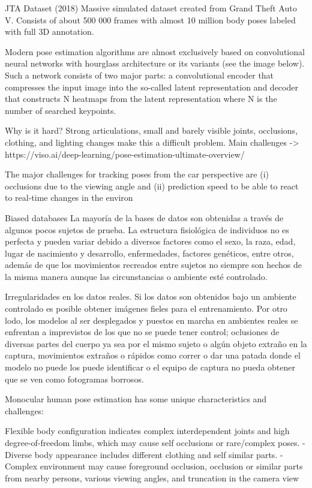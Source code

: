 JTA Dataset (2018)
Massive simulated dataset created from Grand Theft Auto V. Consists of about 500 000 frames with
almost 10 million body poses labeled with full 3D annotation.

Modern pose estimation algorithms are almost exclusively based on convolutional neural networks
with hourglass architecture or its variants (see the image below). Such a network consists of two
major parts: a convolutional encoder that compresses the input image into the so-called latent
representation and decoder that constructs N heatmaps from the latent representation where N is the
number of searched keypoints.

Why is it hard?
Strong articulations, small and barely visible joints, occlusions, clothing, and lighting changes
make this a difficult problem.
Main challenges -> https://viso.ai/deep-learning/pose-estimation-ultimate-overview/

The major challenges for tracking poses from the car perspective are
(i) occlusions due to the viewing angle and (ii) prediction
speed to be able to react to real-time changes in the environ

Biased databases
La mayoría de la bases de datos son obtenidas a través de algunos pocos sujetos de prueba.
La estructura fisiológica de individuos no es perfecta y pueden variar debido a diversos factores
como el sexo, la raza, edad, lugar de nacimiento y desarrollo, enfermedades, factores genéticos, entre
otros, además de que los movimientos recreados entre sujetos no siempre son hechos de la misma manera
aunque las circunstancias o ambiente esté controlado.

Irregularidades en los datos reales.
Si los datos son obtenidos bajo un ambiente controlado es posible obtener imágenes fieles para el
entrenamiento. Por otro lodo, los modelos al ser desplegados y puestos en marcha en ambientes reales
se enfrentan a imprevistos de los que no se puede tener control; oclusiones de diversas partes del
cuerpo ya sea por el mismo sujeto o algún objeto extraño en la captura, movimientos extraños o rápidos
como correr o dar una patada donde el modelo no puede los puede identificar o el equipo de captura
no pueda obtener que se ven como fotogramas borrosos.

Monocular human pose estimation has some unique characteristics
and challenges:

Flexible body configuration indicates complex interdependent
joints and high degree-of-freedom limbs, which may cause self occlusions or rare/complex poses.
- Diverse body appearance includes different clothing and self similar parts.
- Complex environment may cause foreground occlusion, occlusion
or similar parts from nearby persons, various viewing angles, and
truncation in the camera view


